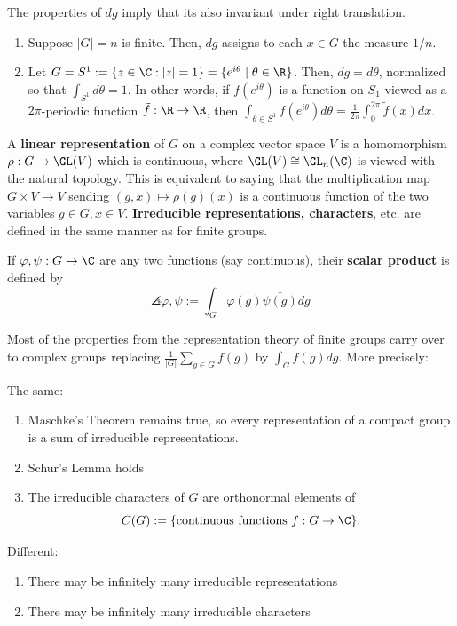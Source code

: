 \begin{rmk}
    The properties of $dg$ imply that its also invariant under right translation.
\end{rmk}

\begin{ex}
    \begin{enumerate}
        \item Suppose $|G|=n$ is finite. Then, $dg$ assigns to each $x \in G$ the measure $1/n$.
        \item Let $G = S^1 :=\{z \in \C :|z|=1\} = \{e^{i\theta}\mid \theta \in \R\}$. Then, $dg =d\theta$, normalized so that $\int _{S^1}d\theta=1$. In other words, if $f(e^{i\theta})$ is a function on $S_1$ viewed as a $2\pi$-periodic function $\tilde f:\R \to \R$, then $\int_{\theta \in S^1} f(e^{i\theta})d\theta = \frac{1}{2\pi}\int _{0}^{2\pi} \tilde f(x)dx$.
    \end{enumerate}
\end{ex}

\begin{defn}
    A \textbf{linear representation} of $G$ on a complex vector space $V$ is a homomorphism $\rho: G \to \GL(V)$ which is continuous, where $\GL (V) \cong \GL _n(\C)$ is viewed with the natural topology. This is equivalent to saying that the multiplication map $G \times V \to V$ sending $(g,x)\mapsto \rho(g)(x)$ is a continuous function of the two variables $g\in G,x \in V$. \textbf{Irreducible representations, characters}, etc. are defined in the same manner as for finite groups.
\end{defn}

\begin{defn}
    If $\varphi, \psi :G \to \C$ are any two functions (say continuous), their \textbf{scalar product} is defined by
    $$\angles{\varphi, \psi}:=\int _G \varphi(g)\bar{\psi (g)}dg $$
\end{defn}

Most of the properties from the representation theory of finite groups carry over to complex groups replacing $\frac{1}{|G|}\sum_{g \in G}f(g)$ by $\int _Gf(g)dg$. More precisely:
\begin{rmk}
    The same:
    \begin{enumerate}
        \item Maschke's Theorem remains true, so every representation of a compact group is a sum of irreducible representations.
        \item Schur's Lemma holds
        \item The irreducible characters of $G$ are orthonormal elements of
        $$C(G) :=\{\text{continuous functions }  f:G \to \C\}.$$
    \end{enumerate}
    Different:
    \begin{enumerate}
        \item There may be infinitely many irreducible representations
        \item There may be infinitely many irreducible characters
    \end{enumerate}
\end{rmk}

